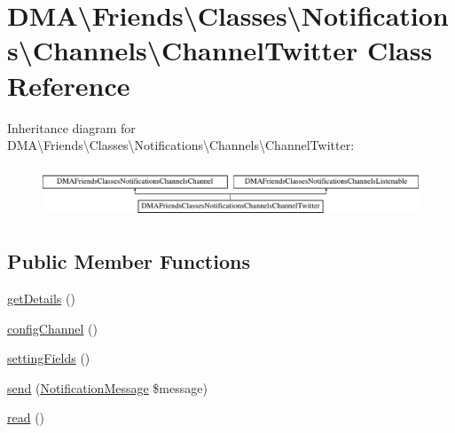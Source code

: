 \hypertarget{classDMA_1_1Friends_1_1Classes_1_1Notifications_1_1Channels_1_1ChannelTwitter}{\section{D\+M\+A\textbackslash{}Friends\textbackslash{}Classes\textbackslash{}Notifications\textbackslash{}Channels\textbackslash{}Channel\+Twitter Class Reference}
\label{classDMA_1_1Friends_1_1Classes_1_1Notifications_1_1Channels_1_1ChannelTwitter}
}
Inheritance diagram for D\+M\+A\textbackslash{}Friends\textbackslash{}Classes\textbackslash{}Notifications\textbackslash{}Channels\textbackslash{}Channel\+Twitter\+:\begin{figure}[H]
\begin{center}
\leavevmode
\includegraphics[height=1.546961cm]{dd/d13/classDMA_1_1Friends_1_1Classes_1_1Notifications_1_1Channels_1_1ChannelTwitter}
\end{center}
\end{figure}
\subsection*{Public Member Functions}
\begin{DoxyCompactItemize}
\item 
\hyperlink{classDMA_1_1Friends_1_1Classes_1_1Notifications_1_1Channels_1_1ChannelTwitter_a25df1af4306d6282d23082c17054aeeb}{get\+Details} ()
\item 
\hyperlink{classDMA_1_1Friends_1_1Classes_1_1Notifications_1_1Channels_1_1ChannelTwitter_a6e5f6e1abe8d6b7c9d0442c3f2560b44}{config\+Channel} ()
\item 
\hyperlink{classDMA_1_1Friends_1_1Classes_1_1Notifications_1_1Channels_1_1ChannelTwitter_a51e362d79b1978fa683709e2794cb6d5}{setting\+Fields} ()
\item 
\hyperlink{classDMA_1_1Friends_1_1Classes_1_1Notifications_1_1Channels_1_1ChannelTwitter_a14439c4b83e7d0e0dd0437f141a998e5}{send} (\hyperlink{classDMA_1_1Friends_1_1Classes_1_1Notifications_1_1NotificationMessage}{Notification\+Message} \$message)
\item 
\hyperlink{classDMA_1_1Friends_1_1Classes_1_1Notifications_1_1Channels_1_1ChannelTwitter_a3b453a0cb63ace5be8f33763949af5b1}{read} ()
\end{DoxyCompactItemize}
